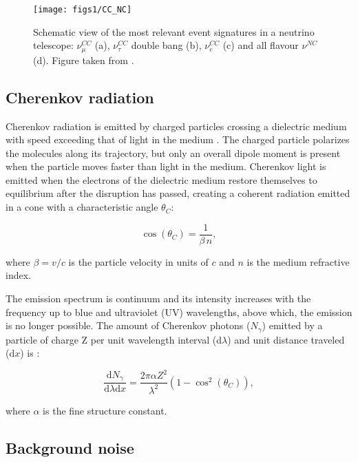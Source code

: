\begin{figure}[htbp]
	\centering
	\texttt{[image: figs1/CC\_NC]}
	\caption{\label{fig:inter}Schematic view of the most relevant event signatures in a neutrino telescope: $\nu_\mu^{CC}$ (a), $\nu_\tau^{CC}$ double bang (b), $\nu_e^{CC}$ (c) and all flavour $\nu^{NC}$ (d). Figure taken from \cite{image_inter}.}
\end{figure}


\subsection{Cherenkov radiation}

Cherenkov radiation is emitted by charged particles crossing a dielectric medium with speed exceeding that of light in the medium \cite{Cheren}. The charged particle polarizes the molecules along its trajectory, but only an overall dipole moment is present when the particle moves faster than light in the medium. Cherenkov light is emitted when the electrons of the dielectric medium restore themselves to equilibrium after the disruption has passed, creating a coherent radiation emitted in a cone with a characteristic angle $\theta_C$:

\begin{equation}
\cos(\theta_C)  = \frac{1}{\beta \, n},
\end{equation}

where $\beta = v/c$ is the particle velocity in units of $c$ and $n$ is the medium refractive index. 

The emission spectrum is continuum and its intensity increases with the frequency up to blue and ultraviolet (UV) wavelengths, above which, the emission is no longer possible. The amount of Cherenkov photons ($N_\gamma$) emitted by a particle of charge Z per unit wavelength interval (d$\lambda$) and unit distance traveled (d$x$) is \cite{N_cheren}:

\begin{equation}
\frac{\mathrm{d}N_\gamma}{\mathrm{d}\lambda \mathrm{d}x} = \frac{2\pi\alpha Z^2}{\lambda^2}\left( 1-\cos^2(\theta_C) \right),
\end{equation}

where $\alpha$ is the fine structure constant.

\subsection{Background noise} %
\label{subsec:background}

